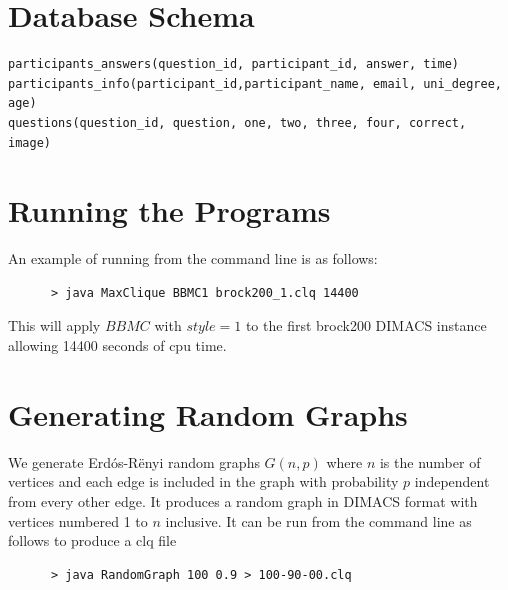 \documentclass{l4proj}
\begin{document}
\begin{appendices}

\chapter{Database Schema}

\begin{verbatim}
participants_answers(question_id, participant_id, answer, time)
participants_info(participant_id,participant_name, email, uni_degree, age)
questions(question_id, question, one, two, three, four, correct, image)
\end{verbatim}


\chapter{Running the Programs}
An example of running from the command line is as follows:
\begin{verbatim}
      > java MaxClique BBMC1 brock200_1.clq 14400
\end{verbatim}
This will apply $BBMC$ with $style = 1$ to the first brock200 DIMACS instance allowing 14400 seconds of cpu time.

\chapter{Generating Random Graphs}
\label{sec:randomGraph}
We generate Erd\'{o}s-R\"{e}nyi random graphs $G(n,p)$ where $n$ is the number of vertices and
each edge is included in the graph with probability $p$ independent from every other edge. It produces
a random graph in DIMACS format with vertices numbered 1 to $n$ inclusive. It can be run from the command line as follows to produce 
a clq file
\begin{verbatim}
      > java RandomGraph 100 0.9 > 100-90-00.clq
\end{verbatim}
\end{appendices}




\end{document}
